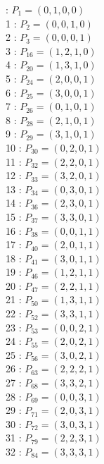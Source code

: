 \documentclass{article}
\begin{document}
{\begin{multicols}{3}
 : $P_{1}=( 0, 1, 0, 0 )$\\
1 : $P_{2}=( 0, 0, 1, 0 )$\\
2 : $P_{3}=( 0, 0, 0, 1 )$\\
3 : $P_{16}=( 1, 2, 1, 0 )$\\
4 : $P_{20}=( 1, 3, 1, 0 )$\\
5 : $P_{24}=( 2, 0, 0, 1 )$\\
6 : $P_{25}=( 3, 0, 0, 1 )$\\
7 : $P_{26}=( 0, 1, 0, 1 )$\\
8 : $P_{28}=( 2, 1, 0, 1 )$\\
9 : $P_{29}=( 3, 1, 0, 1 )$\\
10 : $P_{30}=( 0, 2, 0, 1 )$\\
11 : $P_{32}=( 2, 2, 0, 1 )$\\
12 : $P_{33}=( 3, 2, 0, 1 )$\\
13 : $P_{34}=( 0, 3, 0, 1 )$\\
14 : $P_{36}=( 2, 3, 0, 1 )$\\
15 : $P_{37}=( 3, 3, 0, 1 )$\\
16 : $P_{38}=( 0, 0, 1, 1 )$\\
17 : $P_{40}=( 2, 0, 1, 1 )$\\
18 : $P_{41}=( 3, 0, 1, 1 )$\\
19 : $P_{46}=( 1, 2, 1, 1 )$\\
20 : $P_{47}=( 2, 2, 1, 1 )$\\
21 : $P_{50}=( 1, 3, 1, 1 )$\\
22 : $P_{52}=( 3, 3, 1, 1 )$\\
23 : $P_{53}=( 0, 0, 2, 1 )$\\
24 : $P_{55}=( 2, 0, 2, 1 )$\\
25 : $P_{56}=( 3, 0, 2, 1 )$\\
26 : $P_{63}=( 2, 2, 2, 1 )$\\
27 : $P_{68}=( 3, 3, 2, 1 )$\\
28 : $P_{69}=( 0, 0, 3, 1 )$\\
29 : $P_{71}=( 2, 0, 3, 1 )$\\
30 : $P_{72}=( 3, 0, 3, 1 )$\\
31 : $P_{79}=( 2, 2, 3, 1 )$\\
32 : $P_{84}=( 3, 3, 3, 1 )$\\
\end{multicols}


%


%


}%
\end{document}
